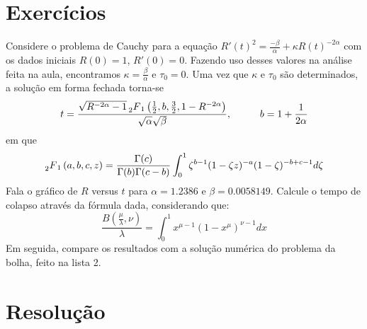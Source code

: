 \documentclass[10pt,a4paper]{article}
\begin{document}
    \section{Exercícios}
    Considere o problema de Cauchy para a equação $R'(t)^2 = \frac{-\beta}{\alpha} + \kappa R(t)^{-2\alpha}$ com os dados iniciais $R(0)=1$, $R'(0)=0$. Fazendo uso desses valores na análise feita na aula, encontramos $\kappa=\frac{\beta}{\alpha}$ e $\tau_0=0$. Uma vez que $\kappa$ e $\tau_0$ são determinados, a solução em forma fechada torna-se
    \[t=\frac{\sqrt{R^{-2\alpha}-1} \prescript{}{2}{F}_1\left(\frac{1}{2}, b, \frac{3}{2}, 1-R^{-2\alpha}\right)}{\sqrt{\alpha}\sqrt{\beta}}, \hspace{1cm} b=1+\frac{1}{2\alpha}\]
    em que
    \[\prescript{}{2}{F}_1\left(a,b,c,z\right) = \frac{\Gamma(c)}{\Gamma(b)\Gamma(c-b)}\int_0^1\zeta^{b-1}(1-\zeta z)^{-a}(1-\zeta)^{-b+c-1}d\zeta \]
    Fala o gráfico de $R$ versus $t$ para $\alpha=1.2386$ e $\beta=0.0058149$. Calcule o tempo de colapso através da fórmula dada, considerando que:
    \[\frac{B\left(\frac{\mu}{\lambda},\nu\right)}{\lambda} = \int_0^1 x^{\mu-1}\left(1-x^\mu\right)^{\nu-1}dx\]
    Em seguida, compare os resultados com a solução numérica do problema da bolha, feito na lista 2.
    
    \section{Resolução}
    
\end{document}
